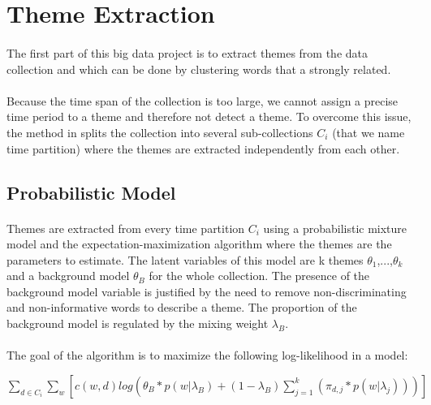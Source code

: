 \section{Theme Extraction}
\label{sec:themeExtraction}

\paragraph{}
The first part of this big data project is to extract themes from the data collection and which can be done by clustering words that a strongly related.

\paragraph{}
Because the time span of the collection is too large, we cannot assign a precise time period to a theme and therefore not detect a theme. To overcome this issue, the method in \cite{kdd05-ttm} splits the collection into several sub-collections $C_{i}$ (that we name time partition) where the themes are extracted independently from each other.

\subsection{Probabilistic Model}

\paragraph{}
Themes are extracted from every time partition $C_{i}$ using a probabilistic mixture model and the expectation-maximization algorithm where the themes are the parameters to estimate. The latent variables of this model are k themes  $\theta_{1}$,...,$\theta_{k}$ and a background model $\theta_{B}$ for the whole collection. The presence of the background model variable is justified by the need to remove non-discriminating and non-informative words to describe a theme. The proportion of the background model is regulated by the mixing weight $\lambda_{B}$.

\paragraph{}
The goal of the algorithm is to maximize the following log-likelihood in a model:

\begin{center}

$
\sum_{d\in C_{i}} \sum_{w} [c(w,d)log(\theta_{B}*p(w|\lambda_{B}) + (1-\lambda_{B})\sum_{j=1}^{k} (\pi_{d,j}*p(w|\lambda_{j})))] 
$

\end{center}

